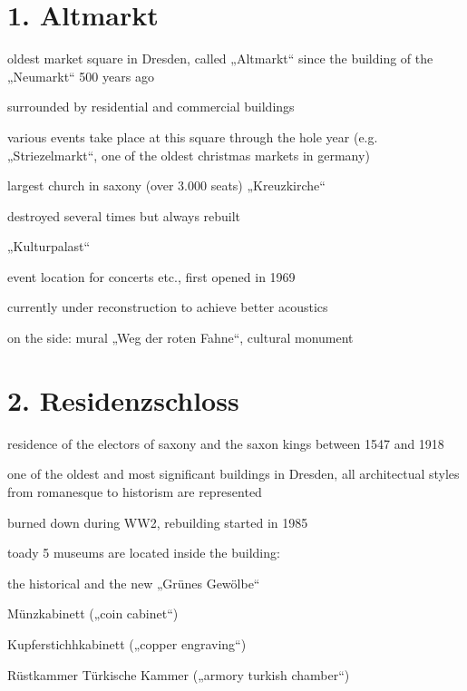 \documentclass[a4paper,12pt]{report}
\begin{document}
\section{1. Altmarkt}
\begin{itemize*}
\item oldest market square in Dresden, called „Altmarkt“ since the building of the „Neumarkt“ 500 years ago
\item surrounded by residential and commercial buildings
\item various events take place at this square through the hole year (e.g. „Striezelmarkt“, one of the oldest christmas markets in germany)
    \begin{itemize*}
    \item largest church in saxony (over 3.000 seats) „Kreuzkirche“
    \item destroyed several times but always rebuilt
    \end{itemize*}
\item „Kulturpalast“
    \begin{itemize*}
    \item event location for concerts etc., first opened in 1969
    \item currently under reconstruction to achieve  better acoustics
    \item on the side: mural „Weg der roten Fahne“, cultural monument
    \end{itemize*}
\end{itemize*}

\section{2. Residenzschloss}
\begin{itemize*}
\item residence of the electors of saxony and the saxon kings between 1547 and 1918
\item one of the oldest and most significant buildings in Dresden, all architectual styles from romanesque to historism are represented
\item burned down during WW2, rebuilding started in 1985
\item toady 5 museums are located inside the building:
    \begin{itemize*}
    \item the historical and the new „Grünes Gewölbe“
    \item Münzkabinett („coin cabinet“)
    \item Kupferstichhkabinett („copper engraving“)
    \item Rüstkammer Türkische Kammer („armory turkish chamber“)
    \end{itemize*}
\end{itemize*}
\end{document}
